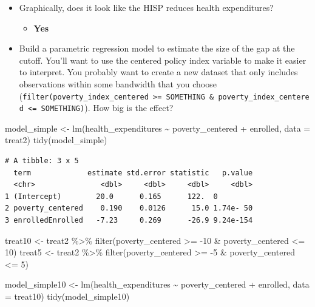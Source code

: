 \documentclass[
  letterpaper,
  DIV=11,
  numbers=noendperiod]{scrartcl}
\newenvironment{Shaded}{\begin{snugshade}}{\end{snugshade}}
\newcommand{\AttributeTok}[1]{\textcolor[rgb]{0.40,0.45,0.13}{#1}}
\newcommand{\DecValTok}[1]{\textcolor[rgb]{0.68,0.00,0.00}{#1}}
\newcommand{\FunctionTok}[1]{\textcolor[rgb]{0.28,0.35,0.67}{#1}}
\newcommand{\NormalTok}[1]{\textcolor[rgb]{0.00,0.23,0.31}{#1}}
\newcommand{\OtherTok}[1]{\textcolor[rgb]{0.00,0.23,0.31}{#1}}
\newcommand{\SpecialCharTok}[1]{\textcolor[rgb]{0.37,0.37,0.37}{#1}}
\providecommand{\tightlist}{%
  \setlength{\itemsep}{0pt}\setlength{\parskip}{0pt}}\usepackage{longtable,booktabs,array}
\begin{document}
\begin{itemize}
\item
  Graphically, does it look like the HISP reduces health expenditures?

  \begin{itemize}
  \tightlist
  \item
    \textbf{Yes}
  \end{itemize}
\item
  Build a parametric regression model to estimate the size of the gap at
  the cutoff. You'll want to use the centered policy index variable to
  make it easier to interpret. You probably want to create a new dataset
  that only includes observations within some bandwidth that you choose
  (\texttt{filter(poverty\_index\_centered\ \textgreater{}=\ SOMETHING\ \&\ poverty\_index\_centered\ \textless{}=\ SOMETHING)}).
  How big is the effect?
\end{itemize}

\begin{Shaded}
\begin{Highlighting}[numbers=left,,]
\NormalTok{model\_simple }\OtherTok{\textless{}{-}} \FunctionTok{lm}\NormalTok{(health\_expenditures }\SpecialCharTok{\textasciitilde{}}\NormalTok{ poverty\_centered }\SpecialCharTok{+}\NormalTok{ enrolled,}
                   \AttributeTok{data =}\NormalTok{ treat2)}
\FunctionTok{tidy}\NormalTok{(model\_simple)}
\end{Highlighting}
\end{Shaded}

\begin{verbatim}
# A tibble: 3 x 5
  term             estimate std.error statistic   p.value
  <chr>               <dbl>     <dbl>     <dbl>     <dbl>
1 (Intercept)        20.0      0.165      122.  0        
2 poverty_centered    0.190    0.0126      15.0 1.74e- 50
3 enrolledEnrolled   -7.23     0.269      -26.9 9.24e-154
\end{verbatim}

\begin{Shaded}
\begin{Highlighting}[numbers=left,,]
\NormalTok{treat10 }\OtherTok{\textless{}{-}}\NormalTok{ treat2 }\SpecialCharTok{\%\textgreater{}\%} 
  \FunctionTok{filter}\NormalTok{(poverty\_centered }\SpecialCharTok{\textgreater{}=} \SpecialCharTok{{-}}\DecValTok{10} \SpecialCharTok{\&}\NormalTok{ poverty\_centered }\SpecialCharTok{\textless{}=} \DecValTok{10}\NormalTok{)}
\NormalTok{treat5 }\OtherTok{\textless{}{-}}\NormalTok{ treat2 }\SpecialCharTok{\%\textgreater{}\%} 
  \FunctionTok{filter}\NormalTok{(poverty\_centered }\SpecialCharTok{\textgreater{}=} \SpecialCharTok{{-}}\DecValTok{5} \SpecialCharTok{\&}\NormalTok{ poverty\_centered }\SpecialCharTok{\textless{}=} \DecValTok{5}\NormalTok{)}

\NormalTok{model\_simple10 }\OtherTok{\textless{}{-}} \FunctionTok{lm}\NormalTok{(health\_expenditures }\SpecialCharTok{\textasciitilde{}}\NormalTok{ poverty\_centered }\SpecialCharTok{+}\NormalTok{ enrolled,}
                   \AttributeTok{data =}\NormalTok{ treat10)}
\FunctionTok{tidy}\NormalTok{(model\_simple10)}
\end{Highlighting}
\end{Shaded}
\end{document}
